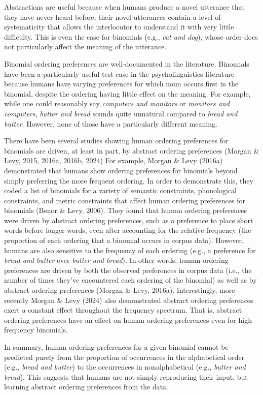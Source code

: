 \documentclass[
  10pt,
  nohyperref]{acl}
\begin{document}
Abstractions are useful because when humans produce a novel utterance
that they have never heard before, their novel utterances contain a
level of systematicity that allows the interlocutor to understand it
with very little difficulty. This is even the case for binomials (e.g.,
\emph{cat and dog}), whose order does not particularly affect the
meaning of the utterance.

Binomial ordering preferences are well-documented in the literature.
Binomials have been a particularly useful test case in the
psycholinguistics literature because humans have varying preferences for
which noun occurs first in the binomial, despite the ordering having
little effect on the meaning. For example, while one could reasonably
say \emph{computers and monitors} or \emph{monitors and computers},
\emph{butter and bread} sounds quite unnatural compared to \emph{bread
and butter}. However, none of those have a particularly different
meaning.

There have been several studies showing human ordering preferences for
binomials are driven, at least in part, by abstract ordering preferences
(Morgan \& Levy, 2015, 2016a, 2016b, 2024) For example, Morgan \& Levy
(2016a) demonstrated that humans show ordering preferences for binomials
beyond simply preferring the more frequent ordering. In order to
demonstrate this, they coded a list of binomials for a variety of
semantic constraints, phonological constraints, and metric constraints
that affect human ordering preferences for binomials (Benor \& Levy,
2006). They found that human ordering preferences were driven by
abstract ordering preferences, such as a preference to place short words
before longer words, even after accounting for the relative frequency
(the proportion of each ordering that a binomial occurs in corpus data).
However, humans are also sensitive to the frequency of each ordering
(e.g., a preference for \emph{bread and butter} over \emph{butter and
bread}). In other words, human ordering preferences are driven by both
the observed preferences in corpus data (i.e., the number of times
they've encountered each ordering of the binomial) as well as by
abstract ordering preferences (Morgan \& Levy, 2016a). Interestingly,
more recently Morgan \& Levy (2024) also demonstrated abstract ordering
preferences exert a constant effect throughout the frequency spectrum.
That is, abstract ordering preferences have an effect on human ordering
preferences even for high-frequency binomials.

In summary, human ordering preferences for a given binomial cannot be
predicted purely from the proportion of occurrences in the alphabetical
order (e.g., \emph{bread and butter}) to the occurrences in
nonalphabetical (e.g., \emph{butter and bread}). This suggests that
humans are not simply reproducing their input, but learning abstract
ordering preferences from the data.
\end{document}
